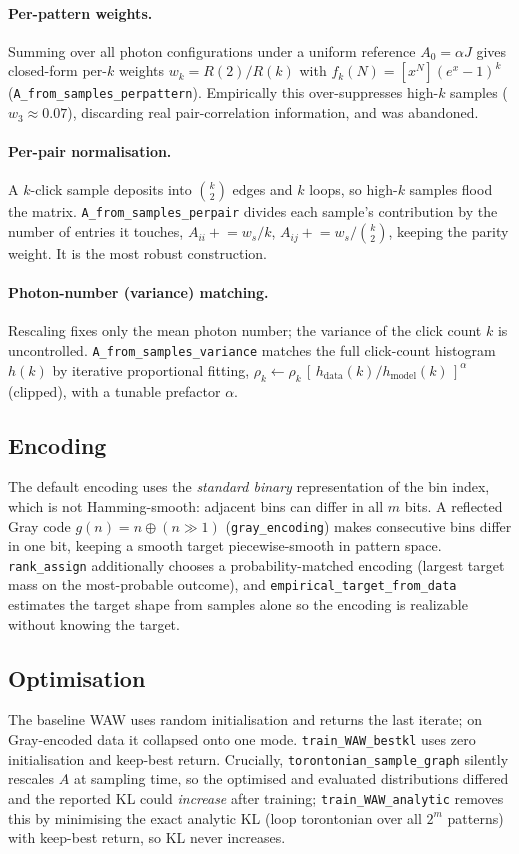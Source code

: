 \documentclass[11pt,a4paper]{article}
\begin{document}
\paragraph{Per-pattern weights.}
Summing over all photon configurations under a uniform reference $A_0=\alpha J$
gives closed-form per-$k$ weights $w_k=R(2)/R(k)$ with
$f_k(N)=[x^N](e^x-1)^k$ (\texttt{A\_from\_samples\_perpattern}). Empirically
this over-suppresses high-$k$ samples ($w_3\approx0.07$), discarding real
pair-correlation information, and was abandoned.

\paragraph{Per-pair normalisation.}
A $k$-click sample deposits into $\binom{k}{2}$ edges and $k$ loops, so high-$k$
samples flood the matrix. \texttt{A\_from\_samples\_perpair} divides each
sample's contribution by the number of entries it touches,
$A_{ii}\mathrel{+}=w_s/k$, $A_{ij}\mathrel{+}=w_s/\binom{k}{2}$, keeping the
parity weight. It is the most robust construction.

\paragraph{Photon-number (variance) matching.}
Rescaling fixes only the mean photon number; the variance of the click count
$k$ is uncontrolled. \texttt{A\_from\_samples\_variance} matches the full
click-count histogram $h(k)$ by iterative proportional fitting,
$\rho_k \leftarrow \rho_k\,[\,h_{\mathrm{data}}(k)/h_{\mathrm{model}}(k)\,]^{\alpha}$
(clipped), with a tunable prefactor $\alpha$.

\subsection{Encoding}
The default encoding uses the \emph{standard binary} representation of the bin
index, which is not Hamming-smooth: adjacent bins can differ in all $m$ bits.
A reflected Gray code $g(n)=n\oplus(n\gg1)$ (\texttt{gray\_encoding}) makes
consecutive bins differ in one bit, keeping a smooth target piecewise-smooth in
pattern space. \texttt{rank\_assign} additionally chooses a probability-matched
encoding (largest target mass on the most-probable outcome), and
\texttt{empirical\_target\_from\_data} estimates the target shape from samples
alone so the encoding is realizable without knowing the target.

\subsection{Optimisation}
The baseline WAW uses random initialisation and returns the last iterate; on
Gray-encoded data it collapsed onto one mode. \texttt{train\_WAW\_bestkl} uses
zero initialisation and keep-best return. Crucially,
\texttt{torontonian\_sample\_graph} silently rescales $A$ at sampling time, so
the optimised and evaluated distributions differed and the reported KL could
\emph{increase} after training; \texttt{train\_WAW\_analytic} removes this by
minimising the exact analytic KL (loop torontonian over all $2^m$ patterns) with
keep-best return, so KL never increases.
\end{document}
